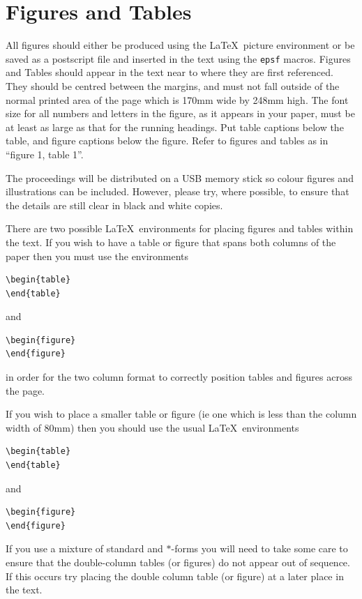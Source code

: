 \documentclass[twocolumn]{afmc_art}
\begin{document}
\section{Figures and Tables}

All figures should either be produced using the \LaTeX\ picture environment
or be saved as a postscript file and inserted in the text using the {\tt epsf}
macros. Figures and Tables should appear in the text near to where they are
first referenced. They should be centred between the margins, and must not fall
outside of the normal printed area of the page which is 170mm wide by 248mm 
high. The font size for all numbers and letters in the figure, as it appears
in your paper, must be at least as large as that for the running headings.
Put table captions below the table, and figure captions below the figure.
Refer to figures and tables as in ``figure 1, table 1''.

The proceedings will be distributed on a USB memory stick so colour figures and 
illustrations can be included. However, please try, where possible, to ensure 
that the details are still clear in black and white copies.

There are two possible \LaTeX\ environments for placing figures and
tables within the text. If you wish to have a table or figure that
spans both columns of the paper then you must use the environments 
\begin{verbatim}
\begin{table}
\end{table}
\end{verbatim}
and 
\begin{verbatim}
\begin{figure}
\end{figure}
\end{verbatim}
in order for the two column format to correctly
position tables and figures across the page.

If you wish to place a smaller table or figure (ie one which is less
than the column width of 80mm) then you should use the usual \LaTeX\
environments
\begin{verbatim}
\begin{table}
\end{table}
\end{verbatim}
and 
\begin{verbatim}
\begin{figure}
\end{figure}
\end{verbatim}
If you use a mixture of standard and $*$-forms
you will need to take some care to ensure that the 
double-column tables (or figures) do not appear out
of sequence.  If this occurs try placing the double
column table (or figure) at a later place in the text.
\end{document}
